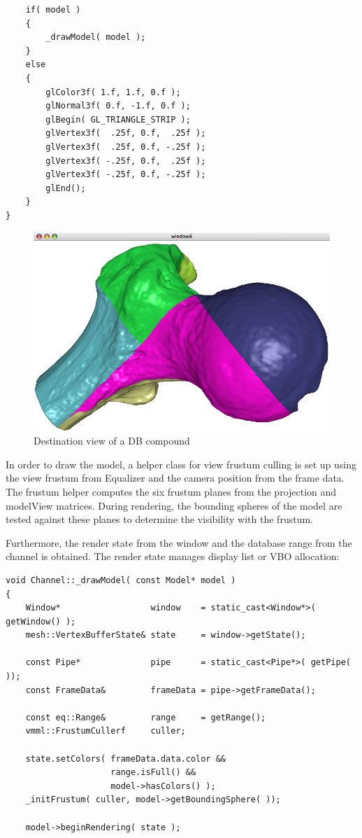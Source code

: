 \documentclass[10pt,a4]{scrartcl}
\begin{document}
{\footnotesize\begin{lstlisting}
    if( model )
    {
        _drawModel( model );
    }
    else
    {
        glColor3f( 1.f, 1.f, 0.f );
        glNormal3f( 0.f, -1.f, 0.f );
        glBegin( GL_TRIANGLE_STRIP );
        glVertex3f(  .25f, 0.f,  .25f );
        glVertex3f(  .25f, 0.f, -.25f );
        glVertex3f( -.25f, 0.f,  .25f );
        glVertex3f( -.25f, 0.f, -.25f );
        glEnd();
    }
}
\end{lstlisting}}

\begin{figure}
  \includegraphics[width=.382\textwidth]{images/DB.png}
  {\caption{\small\label{fDB}Destination view of a DB compound}}
\end{figure}
In order to draw the model, a helper class for view frustum culling is
set up using the view frustum from Equalizer and the camera position
from the frame data. The frustum helper computes the six frustum planes
from the projection and modelView matrices. During rendering, the
bounding spheres of the model are tested against these planes to
determine the visibility with the frustum.

Furthermore, the render state from the window and the database range
from the channel is obtained. The render state manages display list or
VBO allocation:

{\footnotesize\begin{lstlisting}
void Channel::_drawModel( const Model* model )
{
    Window*                  window    = static_cast<Window*>( getWindow() );
    mesh::VertexBufferState& state     = window->getState();

    const Pipe*              pipe      = static_cast<Pipe*>( getPipe( ));
    const FrameData&         frameData = pipe->getFrameData();

    const eq::Range&         range     = getRange();
    vmml::FrustumCullerf     culler;

    state.setColors( frameData.data.color && 
                     range.isFull() && 
                     model->hasColors() );
    _initFrustum( culler, model->getBoundingSphere( ));

    model->beginRendering( state );
        
\end{lstlisting}}
\end{document}

